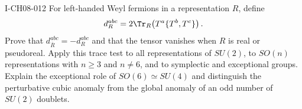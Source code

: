 \begin{exercise}{I-CH08-012}
For left-handed Weyl fermions in a representation $R$, define
\[
 d_R^{abc}=2\Tr_R\!\left(T^a\{T^b,T^c\}\right).
\]
Prove that $d_{\overline R}^{abc}=-d_R^{abc}$ and that the tensor vanishes
when $R$ is real or pseudoreal.  Apply this trace test to all representations
of $SU(2)$, to $SO(n)$ representations with $n\ge3$ and $n\ne6$, and to
symplectic and exceptional groups.  Explain the exceptional role of
$SO(6)\simeq SU(4)$ and distinguish the perturbative cubic anomaly from the
global anomaly of an odd number of $SU(2)$ doublets.
\end{exercise}
